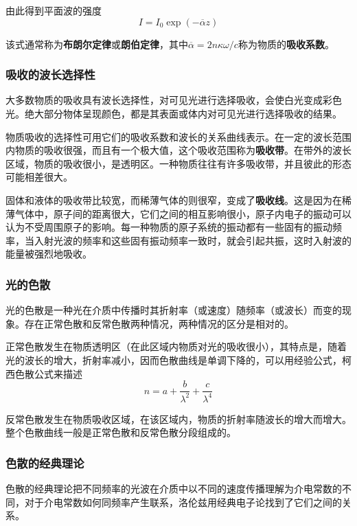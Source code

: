 \documentclass[UTF8]{ctexart}
\begin{document}
\noindent 由此得到平面波的强度
\begin{equation}
	I = I_{0} \exp (- \overline{\alpha} z)
\end{equation}

\noindent 该式通常称为\textbf{布朗尔定律}或\textbf{朗伯定律}，其中$ \overline{\alpha} = 2 n \kappa \omega / c $称为物质的\textbf{吸收系数}。

	\subsubsection{吸收的波长选择性}
大多数物质的吸收具有波长选择性，对可见光进行选择吸收，会使白光变成彩色光。绝大部分物体呈现颜色，都是其表面或体内对可见光进行选择吸收的结果。

物质吸收的选择性可用它们的吸收系数和波长的关系曲线表示。在一定的波长范围内物质的吸收很强，而且有一个极大值，这个吸收范围称为\textbf{吸收带}。在带外的波长区域，物质的吸收很小，是透明区。一种物质往往有许多吸收带，并且彼此的形态可能相差很大。

固体和液体的吸收带比较宽，而稀薄气体的则很窄，变成了\textbf{吸收线}。这是因为在稀薄气体中，原子间的距离很大，它们之间的相互影响很小，原子内电子的振动可以认为不受周围原子的影响。每一种物质的原子系统的振动都有一些固有的振动频率，当入射光波的频率和这些固有振动频率一致时，就会引起共振，这时入射波的能量被强烈地吸收。

\subsubsection{光的色散}
光的色散是一种光在介质中传播时其折射率（或速度）随频率（或波长）而变的现象。存在正常色散和反常色散两种情况，两种情况的区分是相对的。

正常色散发生在物质透明区（在此区域内物质对光的吸收很小），其特点是，随着光的波长的增大，折射率减小，因而色散曲线是单调下降的，可以用经验公式，柯西色散公式来描述
\begin{equation}
n= a +\frac{b}{\lambda^{2}}+\frac{c}{\lambda^{4}}
\end{equation}

\noindent 反常色散发生在物质吸收区域，在该区域内，物质的折射率随波长的增大而增大。整个色散曲线一般是正常色散和反常色散分段组成的。

	\subsubsection{色散的经典理论}
	色散的经典理论把不同频率的光波在介质中以不同的速度传播理解为介电常数的不同，对于介电常数如何同频率产生联系，洛伦兹用经典电子论找到了它们之间的关系。
	
\end{document}
